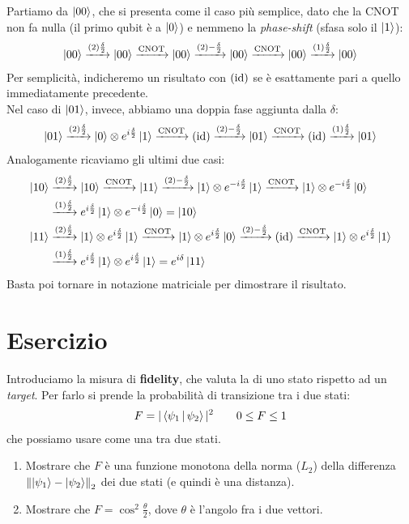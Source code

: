 \documentclass[../../InformazioneQuantistica.tex]{subfiles}
\begin{document}
Partiamo da $\Ket{00}$, che si presenta come il caso più semplice, dato che la CNOT non fa nulla (il primo qubit è a $\Ket{0}$) e nemmeno la \textit{phase-shift} (sfasa solo il $\Ket{1}$):
\begin{align*}
\Ket{00}\xrightarrow{(2)\frac{\delta}{2}}\Ket{00}\xrightarrow{\operatorname{CNOT}} \Ket{00}\xrightarrow{(2)-\frac{\delta}{2}}\Ket{00}\xrightarrow{\operatorname{CNOT}} \Ket{00} \xrightarrow{(1)\frac{\delta}{2}}\Ket{00}
\end{align*}
Per semplicità, indicheremo un risultato con $(\operatorname{id})$ se è esattamente pari a quello immediatamente precedente.\\
Nel caso di $\Ket{01}$, invece, abbiamo una doppia fase aggiunta dalla $\delta$:
\begin{align*}
\Ket{01} \xrightarrow{(2)\frac{\delta}{2}} \Ket{0}\otimes e^{i\frac{\delta}{2}}\Ket{1} \xrightarrow{\operatorname{CNOT}} (\operatorname{id})\xrightarrow{(2)-\frac{\delta}{2}} \Ket{01}\xrightarrow{\operatorname{CNOT}}(\operatorname{id})  \xrightarrow{(1)\frac{\delta}{2}}
\Ket{01}
\end{align*}
Analogamente ricaviamo gli ultimi due casi:
\begin{align*}
\Ket{10}&\xrightarrow{(2)\frac{\delta}{2}} \Ket{10} \xrightarrow{\operatorname{CNOT}}\Ket{11}
\xrightarrow{(2)-\frac{\delta}{2}} \Ket{1}\otimes e^{-i\frac{\delta}{2}}\Ket{1}\xrightarrow{\operatorname{CNOT}} \Ket{1}\otimes e^{-i\frac{\delta}{2}}\Ket{0}\\
&\xrightarrow{(1)\frac{\delta}{2}} e^{i\frac{\delta}{2}}\Ket{1}\otimes e^{-i\frac{\delta}{2}}\Ket{0}=\Ket{10}\\
\Ket{11}&\xrightarrow{(2)\frac{\delta}{2}} \Ket{1}\otimes e^{i\frac{\delta}{2}}\Ket{1} \xrightarrow{\operatorname{CNOT}} \Ket{1}\otimes e^{i\frac{\delta}{2}}\Ket{0} \xrightarrow{(2)-\frac{\delta}{2}} (\operatorname{id}) \xrightarrow{\operatorname{CNOT}}\Ket{1}\otimes e^{i\frac{\delta}{2}}\Ket{1}\\
&\xrightarrow{(1)\frac{\delta}{2}} e^{i\frac{\delta}{2}}\Ket{1}\otimes e^{i\frac{\delta}{2}}\Ket{1}=e^{i\delta}\Ket{11}
\end{align*}
Basta poi tornare in notazione matriciale per dimostrare il risultato.

\section{Esercizio \theEsercizio}
Introduciamo la misura di \textbf{fidelity}, che valuta la  di uno stato rispetto ad un \textit{target}. Per farlo si prende la probabilità di transizione tra i due stati:
\begin{align*}
F=|\Braket{\psi_1|\psi_2}|^2 \qquad 0\leq F \leq 1
\end{align*}
che possiamo usare come una  tra due stati.
\begin{enumerate}
\item Mostrare che $F$ è una funzione monotona della norma ($L_2$) della differenza $\left\lVert\Ket{\psi_1}-\Ket{\psi_2}\right\rVert_2$ dei due stati (e quindi è una distanza).
\item Mostrare che $F= \cos^2\frac{\theta}{2}$, dove $\theta$ è l'angolo fra i due vettori.
\end{enumerate}
\end{document}
